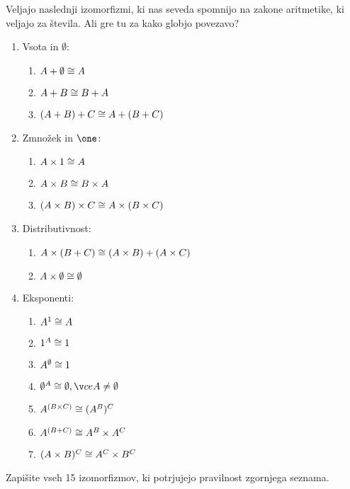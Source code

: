 Veljajo naslednji izomorfizmi, ki nas seveda spomnijo na zakone aritmetike, ki
veljajo za števila. Ali gre tu za kako globjo povezavo?
%
\begin{enumerate}
\item Vsota in $\emptyset$:
  \begin{enumerate}
    \item $A + \emptyset \cong A$
    \item $A + B \cong B + A$
    \item $(A + B) + C \cong A + (B + C)$
  \end{enumerate}

\item Zmnožek in $\one$:
  \begin{enumerate}
    \item $A \times 1 \cong A$
    \item $A \times B \cong B \times A$
    \item $(A \times B) \times C \cong A \times (B \times C)$
  \end{enumerate}

\item Distributivnost:
  \begin{enumerate}
    \item $A \times (B + C) \cong (A \times B) + (A \times C)$
    \item $A \times \emptyset \cong \emptyset$
  \end{enumerate}

\item Eksponenti:
  \begin{enumerate}
    \item $A^1 \cong A$
    \item $1^A \cong 1$
    \item $A^{\emptyset }\cong 1$
    \item $\emptyset^A \iso \emptyset , če  A \neq \emptyset$
    \item $A^{(B \times C)} \cong (A^B)^C$
    \item $A^{(B + C)} \cong A^B \times A^C$
    \item $(A \times B)^C \cong A^C \times B^C$
  \end{enumerate}
\end{enumerate}

\begin{naloga}
  Zapišite vseh 15 izomorfizmov, ki potrjujejo pravilnost zgornjega seznama.
\end{naloga}
